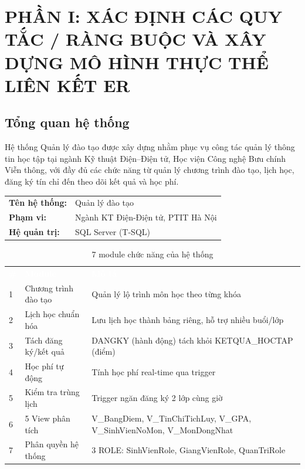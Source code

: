 \documentclass[13pt, a4paper]{article}
\begin{document}
\newpage
\renewcommand{\contentsname}{MỤC LỤC}
\tableofcontents

\newpage
{}

\section{PHẦN I: XÁC ĐỊNH CÁC QUY TẮC / RÀNG BUỘC VÀ XÂY DỰNG MÔ HÌNH THỰC THỂ LIÊN KẾT ER}

\subsection{Tổng quan hệ thống}

\noindent Hệ thống Quản lý đào tạo được xây dựng nhằm phục vụ công tác quản lý thông tin học tập tại ngành Kỹ thuật Điện--Điện tử, Học viện Công nghệ Bưu chính Viễn thông, với đầy đủ các chức năng từ quản lý chương trình đào tạo, lịch học, đăng ký tín chỉ đến theo dõi kết quả và học phí.

\begin{center}
\begin{tabular}{ll}
  \textbf{Tên hệ thống:} & Quản lý đào tạo  \\
  \textbf{Phạm vi:}      & Ngành KT Điện-Điện tử, PTIT Hà Nội \\
  \textbf{Hệ quản trị:}  & SQL Server (T-SQL)
\end{tabular}
\end{center}

\begin{table}[H]
\centering
\renewcommand{\arraystretch}{1.35}
\begin{tabular}{>{\centering}p{0.5cm} p{4cm} p{8.5cm}}
  \rowcolor{tableheadbg}
  \textcolor{white}{\textbf{\#}} &
  \textcolor{white}{\textbf{Module}} &
  \textcolor{white}{\textbf{Mô tả}} \\
  \rowcolor{white}      1 & Chương trình đào tạo & Quản lý lộ trình môn học theo từng khóa \\
  \rowcolor{tablerowalt}2 & Lịch học chuẩn hóa   & Lưu lịch học thành bảng riêng, hỗ trợ nhiều buổi/lớp \\
  \rowcolor{white}      3 & Tách đăng ký/kết quả & DANGKY (hành động) tách khỏi KETQUA\_HOCTAP (điểm) \\
  \rowcolor{tablerowalt}4 & Học phí tự động       & Tính học phí real-time qua trigger \\
  \rowcolor{white}      5 & Kiểm tra trùng lịch   & Trigger ngăn đăng ký 2 lớp cùng giờ \\
  \rowcolor{tablerowalt}6 & 5 View phân tích      & V\_BangDiem, V\_TinChiTichLuy, V\_GPA, V\_SinhVienNoMon, V\_MonDongNhat \\
  \rowcolor{white}      7 & Phân quyền hệ thống   & 3 ROLE: SinhVienRole, GiangVienRole, QuanTriRole \\
\end{tabular}
\caption{7 module chức năng của hệ thống}
\end{table}
\end{document}
